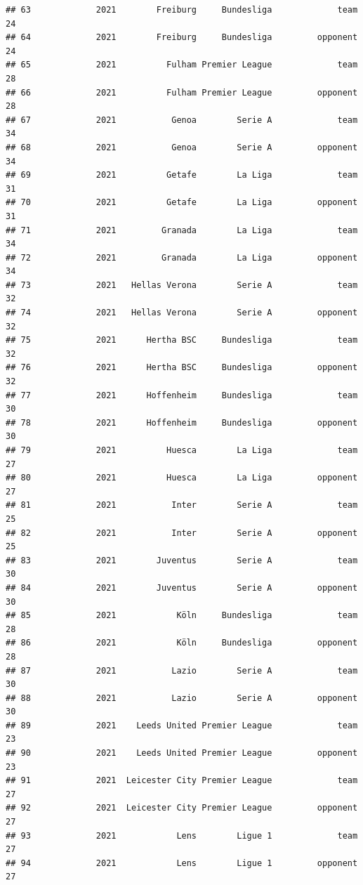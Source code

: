 \documentclass[
]{book}
\theoremstyle{definition}
\theoremstyle{definition}
\theoremstyle{definition}
\theoremstyle{definition}
\theoremstyle{remark}
\begin{document}
\begin{verbatim}
## 63             2021        Freiburg     Bundesliga             team          24
## 64             2021        Freiburg     Bundesliga         opponent          24
## 65             2021          Fulham Premier League             team          28
## 66             2021          Fulham Premier League         opponent          28
## 67             2021           Genoa        Serie A             team          34
## 68             2021           Genoa        Serie A         opponent          34
## 69             2021          Getafe        La Liga             team          31
## 70             2021          Getafe        La Liga         opponent          31
## 71             2021         Granada        La Liga             team          34
## 72             2021         Granada        La Liga         opponent          34
## 73             2021   Hellas Verona        Serie A             team          32
## 74             2021   Hellas Verona        Serie A         opponent          32
## 75             2021      Hertha BSC     Bundesliga             team          32
## 76             2021      Hertha BSC     Bundesliga         opponent          32
## 77             2021      Hoffenheim     Bundesliga             team          30
## 78             2021      Hoffenheim     Bundesliga         opponent          30
## 79             2021          Huesca        La Liga             team          27
## 80             2021          Huesca        La Liga         opponent          27
## 81             2021           Inter        Serie A             team          25
## 82             2021           Inter        Serie A         opponent          25
## 83             2021        Juventus        Serie A             team          30
## 84             2021        Juventus        Serie A         opponent          30
## 85             2021            Köln     Bundesliga             team          28
## 86             2021            Köln     Bundesliga         opponent          28
## 87             2021           Lazio        Serie A             team          30
## 88             2021           Lazio        Serie A         opponent          30
## 89             2021    Leeds United Premier League             team          23
## 90             2021    Leeds United Premier League         opponent          23
## 91             2021  Leicester City Premier League             team          27
## 92             2021  Leicester City Premier League         opponent          27
## 93             2021            Lens        Ligue 1             team          27
## 94             2021            Lens        Ligue 1         opponent          27

\end{verbatim}
\end{document}
